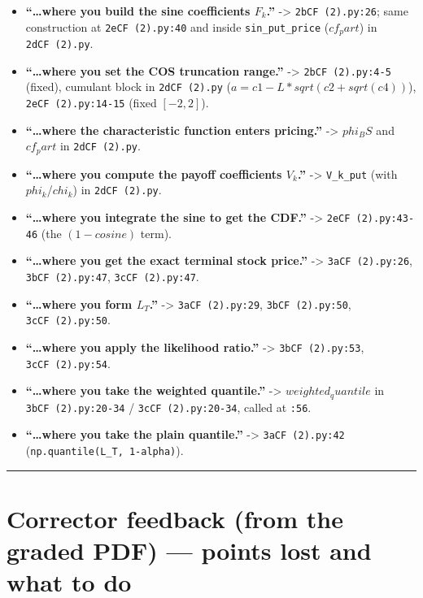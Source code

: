 \documentclass[
  11pt,
]{article}
\providecommand{\tightlist}{%
  \setlength{\itemsep}{0pt}\setlength{\parskip}{0pt}}
\begin{document}
\begin{itemize}
\tightlist
\item
  \textbf{``\ldots where you build the sine coefficients \(F_k\).''}
  -\textgreater{} \texttt{2bCF\ (2).py:26}; same construction at
  \texttt{2eCF\ (2).py:40} and inside \texttt{sin\_put\_price}
  (\(cf_part\)) in \texttt{2dCF\ (2).py}.
\item
  \textbf{``\ldots where you set the COS truncation range.''}
  -\textgreater{} \texttt{2bCF\ (2).py:4-5} (fixed), cumulant block in
  \texttt{2dCF\ (2).py} (\(a = c1 - L*sqrt(c2+sqrt(c4))\)),
  \texttt{2eCF\ (2).py:14-15} (fixed \([-2,2]\)).
\item
  \textbf{``\ldots where the characteristic function enters pricing.''}
  -\textgreater{} \(phi_BS\) and \(cf_part\) in \texttt{2dCF\ (2).py}.
\item
  \textbf{``\ldots where you compute the payoff coefficients \(V_k\).''}
  -\textgreater{} \texttt{V\_k\_put} (with \(phi_k\)/\(chi_k\)) in
  \texttt{2dCF\ (2).py}.
\item
  \textbf{``\ldots where you integrate the sine to get the CDF.''}
  -\textgreater{} \texttt{2eCF\ (2).py:43-46} (the \((1 - cosine)\)
  term).
\item
  \textbf{``\ldots where you get the exact terminal stock price.''}
  -\textgreater{} \texttt{3aCF\ (2).py:26}, \texttt{3bCF\ (2).py:47},
  \texttt{3cCF\ (2).py:47}.
\item
  \textbf{``\ldots where you form \(L_T\).''} -\textgreater{}
  \texttt{3aCF\ (2).py:29}, \texttt{3bCF\ (2).py:50},
  \texttt{3cCF\ (2).py:50}.
\item
  \textbf{``\ldots where you apply the likelihood ratio.''}
  -\textgreater{} \texttt{3bCF\ (2).py:53}, \texttt{3cCF\ (2).py:54}.
\item
  \textbf{``\ldots where you take the weighted quantile.''}
  -\textgreater{} \(weighted_quantile\) in \texttt{3bCF\ (2).py:20-34} /
  \texttt{3cCF\ (2).py:20-34}, called at \texttt{:56}.
\item
  \textbf{``\ldots where you take the plain quantile.''} -\textgreater{}
  \texttt{3aCF\ (2).py:42} (\texttt{np.quantile(L\_T,\ 1-alpha)}).
\end{itemize}

\begin{center}\rule{0.5\linewidth}{0.5pt}\end{center}

\hypertarget{corrector-feedback-from-the-graded-pdf-points-lost-and-what-to-do}{%
\section{Corrector feedback (from the graded PDF) --- points lost and
what to
do}\label{corrector-feedback-from-the-graded-pdf-points-lost-and-what-to-do}}
\end{document}
